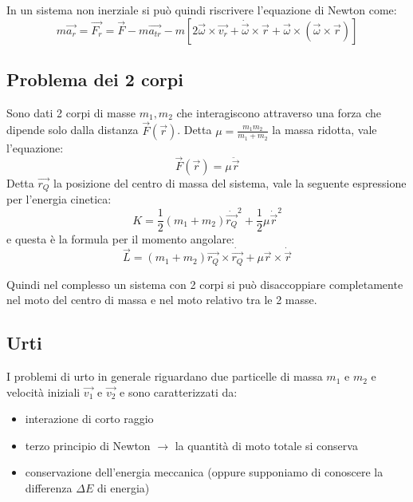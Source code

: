 \documentclass[../main.tex]{subfiles}
\begin{document}
In un sistema non inerziale si può quindi riscrivere l'equazione di Newton come:
\begin{equation}\label{ForzaNonInerziale}
	m\vec{a_r}=\vec{F_r}=\vec{F}-m\overrightarrow{a_{tr}}-m\left[2\vec{\omega}\times\vec{v_r}+\dot{\vec{\omega}}\times\vec{r}+\vec{\omega}\times(\vec{\omega}\times\vec{r})\right]
\end{equation}

\subsection{Problema dei 2 corpi}
Sono dati 2 corpi di masse $m_1,m_2$ che interagiscono attraverso una forza che dipende 
solo dalla distanza $\vec F(\vec r)$.
Detta $\mu=\frac{m_1m_2}{m_1+m_2}$ la massa ridotta, vale l'equazione:
\begin{equation}\label{ForzaMassaRidotta}
	\vec F(\vec r)=\mu \ddot {\vec{r}}
\end{equation}
Detta $\overrightarrow{ r_Q }$ la posizione del centro di massa del sistema, vale la seguente espressione per l'energia cinetica:
\begin{equation}\label{Cinetica2Corpi}
	K=\frac12(m_1+m_2)\dot{\overrightarrow{r_Q}}^2+\frac12\mu\dot{\vec{r}}^2
\end{equation}
e questa è la formula per il momento angolare:
\begin{equation}\label{Momento2Corpi}
	\vec L=(m_1+m_2)\overrightarrow{r_Q}\times \dot{\overrightarrow{r_Q}}+\mu \vec r\times\dot{\vec r}
\end{equation}

Quindi nel complesso un sistema con 2 corpi si può disaccoppiare completamente nel moto del centro di massa e nel
moto relativo tra le 2 masse.

\subsection{Urti}
I problemi di urto in generale riguardano due particelle di massa $m_1$ e $m_2$ e velocità iniziali $\overrightarrow {v_1}$ e $\overrightarrow {v_2}$ e sono caratterizzati da:
\begin{itemize}
 \item interazione di corto raggio
 \item terzo principio di Newton $\rightarrow$ la quantità di moto totale si conserva
 \item conservazione dell'energia meccanica (oppure supponiamo di conoscere la differenza $\Delta E$ di energia)
\end{itemize}
\end{document}
